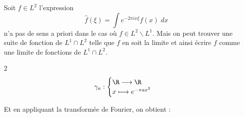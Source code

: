 \begin{remark}
    Soit $ f \in L^2$ l'expression $$ \hat{f}(\xi) = \int e^{-2 \pi i x \xi} f(x) \; dx $$ n'a pas de sens a priori dans le cas où $f \in L^2 \backslash L^1$. 
    {Mais} on peut trouver une suite de fonction de $L^1 \cap L^2$ telle que $f$ en soit la limite et ainsi écrire $f$ comme une limite de fonctions de $L^1 \cap L^2$.
\end{remark}

\begin{example}

    \vspace{0.5cm}
    
    \begin{multicols}{2}
        \[ \gamma_a : 
            \begin{cases}
                \R \longrightarrow \R \\ 
                x \longmapsto e^{- \pi a x^2}
            \end{cases}
        \]
    
    \end{multicols}

    Et en appliquant la transformée de Fourier, on obtient :


\end{example}

